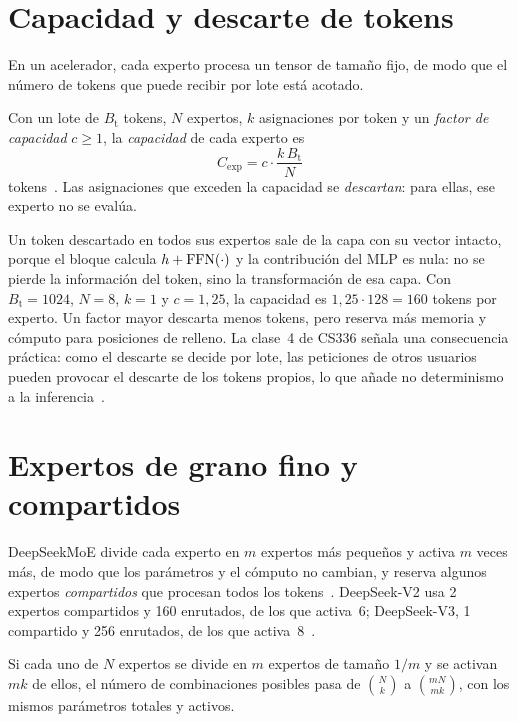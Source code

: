 \section{Capacidad y descarte de tokens}

En un acelerador, cada experto procesa un tensor de tamaño fijo, de modo que el número de tokens que puede recibir por lote está acotado.

\begin{definicion}\label{def:capacidad}
Con un lote de $B_{\mathrm{t}}$ tokens, $N$ expertos, $k$ asignaciones por token y un \emph{factor de capacidad} $c\ge 1$, la \emph{capacidad} de cada experto es
\[
C_{\mathrm{exp}}=c\cdot\frac{k\,B_{\mathrm{t}}}{N}
\]
tokens~\cite[§2.2, ec.~3]{switch}. Las asignaciones que exceden la capacidad se \emph{descartan}: para ellas, ese experto no se evalúa.
\end{definicion}

Un token descartado en todos sus expertos sale de la capa con su vector intacto, porque el bloque calcula $h+\operatorname{FFN}(\cdot)$ y la contribución del MLP es nula: no se pierde la información del token, sino la transformación de esa capa. Con $B_{\mathrm{t}}=1024$, $N=8$, $k=1$ y $c=1{,}25$, la capacidad es $1{,}25\cdot 128=160$ tokens por experto. Un factor mayor descarta menos tokens, pero reserva más memoria y cómputo para posiciones de relleno. La clase~4 de CS336 señala una consecuencia práctica: como el descarte se decide por lote, las peticiones de otros usuarios pueden provocar el descarte de los tokens propios, lo que añade no determinismo a la inferencia~\cite{cs336}.

\section{Expertos de grano fino y compartidos}

DeepSeekMoE divide cada experto en $m$ expertos más pequeños y activa $m$ veces más, de modo que los parámetros y el cómputo no cambian, y reserva algunos expertos \emph{compartidos} que procesan todos los tokens~\cite[§2.2.1]{deepseekv2}. DeepSeek-V2 usa 2 expertos compartidos y 160 enrutados, de los que activa~6; DeepSeek-V3, 1 compartido y 256 enrutados, de los que activa~8~\cite{deepseekv2,deepseekv3}.

\begin{proposicion}\label{prop:combinaciones}
Si cada uno de $N$ expertos se divide en $m$ expertos de tamaño $1/m$ y se activan $mk$ de ellos, el número de combinaciones posibles pasa de $\binom{N}{k}$ a $\binom{mN}{mk}$, con los mismos parámetros totales y activos.
\end{proposicion}

